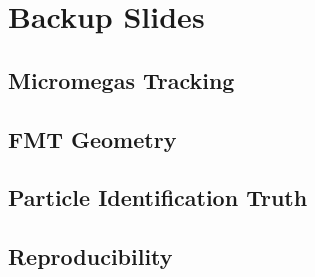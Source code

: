 \section*{}
\begin{frame}{}
    \centering \Huge{}
\end{frame}

\section*{Backup Slides}
\subsection*{Micromegas Tracking}


\subsection*{FMT Geometry}


\subsection*{Particle Identification Truth}


\subsection*{Reproducibility}


% 

% 

% 

% 

